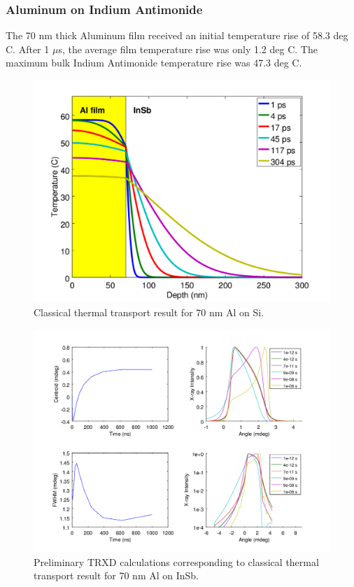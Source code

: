 \documentclass[letterpaper,11pt]{article}
\begin{document}
\subsubsection{Aluminum on Indium Antimonide}
The 70 nm thick Aluminum film received an initial temperature rise of 58.3 deg C. After 1 $\mu$s, the average film temperature rise was only 1.2 deg C.  The maximum bulk Indium Antimonide temperature rise was 47.3 deg C.
\begin{figure}
\includegraphics[scale = 0.65]{InSb_Temp.png}
\caption{Classical thermal transport result for 70 nm Al on Si.}
\end{figure}
\begin{figure}
\includegraphics[scale = 0.65]{InSb_TRXD.png}
\caption{Preliminary TRXD calculations corresponding to classical thermal transport result for 70 nm Al on InSb.}
\end{figure}
\newpage
\end{document}
